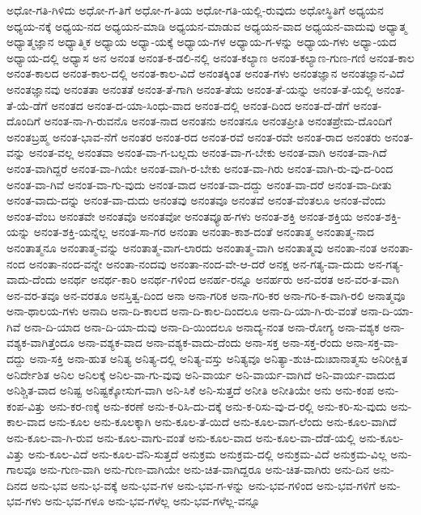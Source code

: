 {ಅಧೋ-ಗತಿ-ಗಿಳಿದು
ಅಧೋ-ಗ-ತಿಗೆ
ಅಧೋ-ಗ-ತಿಯ
ಅಧೋ-ಗತಿ-ಯಲ್ಲಿ-ರುವುದು
ಅಧೋಸ್ಥಿತಿಗೆ
ಅಧ್ಯಯನ
ಅಧ್ಯಯ-ನಕ್ಕೆ
ಅಧ್ಯಯ-ನದ
ಅಧ್ಯಯನ-ಮಾಡಿ
ಅಧ್ಯಯನ-ಮಾಡುವ
ಅಧ್ಯಯನ-ವಾದ
ಅಧ್ಯಯನ-ವಾದುವು
ಅಧ್ಯಾತ್ಮ
ಅಧ್ಯಾತ್ಮಜ್ಞಾನ
ಅಧ್ಯಾತ್ಮಿಕ
ಅಧ್ಯಾಯ
ಅಧ್ಯಾ-ಯಕ್ಕೆ
ಅಧ್ಯಾಯ-ಗಳ
ಅಧ್ಯಾಯ-ಗ-ಳನ್ನು
ಅಧ್ಯಾಯ-ಗಳು
ಅಧ್ಯಾ-ಯದ
ಅಧ್ಯಾಯ-ದಲ್ಲಿ
ಅಧ್ಯಾಸ
ಅನ
ಅನಂತ
ಅನಂತ-ಕ-ಡಲಿ-ನಲ್ಲಿ
ಅನಂತ-ಕಲ್ಯಾಣ
ಅನಂತ-ಕಲ್ಯಾಣ-ಗುಣ-ಗಣಿ
ಅನಂತ-ಕಾಲ
ಅನಂತ-ಕಾಲದ
ಅನಂತ-ಕಾಲ-ದಲ್ಲಿ
ಅನಂತ-ಕಾಲ-ವಿದೆ
ಅನಂತಕ್ಕಿಂತ
ಅನಂತ-ಗಳು
ಅನಂತಜ್ಞಾನ
ಅನಂತಜ್ಞಾನ-ವಿದೆ
ಅನಂತಜ್ಞಾನವು
ಅನಂತತಾ
ಅನಂತತೆ
ಅನಂತ-ತೆ-ಗಾಗಿ
ಅನಂತ-ತೆಯ
ಅನಂತ-ತೆ-ಯನ್ನು
ಅನಂತ-ತೆ-ಯಲ್ಲಿ
ಅನಂತ-ತೆ-ಯೆ-ಡೆಗೆ
ಅನಂತದ
ಅನಂತ-ದ-ಯಾ-ಸಿಂಧು-ವಾದ
ಅನಂತ-ದಲ್ಲಿ
ಅನಂತ-ದಿಂದ
ಅನಂತ-ದೆ-ಡೆಗೆ
ಅನಂತ-ದೊಂದಿಗೆ
ಅನಂತ-ನಾ-ಗಿ-ರುವನೊ
ಅನಂತ-ನಾದ
ಅನಂತನು
ಅನಂತನೂ
ಅನಂತಪ್ರೀತಿ
ಅನಂತಪ್ರೇಮ-ದೊಂದಿಗೆ
ಅನಂತಬ್ರಹ್ಮ
ಅನಂತ-ಭಾವ-ನೆಗೆ
ಅನಂತರ
ಅನಂತ-ರದ
ಅನಂತ-ರವೆ
ಅನಂತ-ರವೇ
ಅನಂತ-ರಾದ
ಅನಂತರು
ಅನಂತ-ವನ್ನು
ಅನಂತ-ವಲ್ಲ
ಅನಂತವಾ
ಅನಂತ-ವಾ-ಗ-ಬಲ್ಲದು
ಅನಂತ-ವಾ-ಗ-ಬೇಕು
ಅನಂತ-ವಾಗಿ
ಅನಂತ-ವಾ-ಗಿದೆ
ಅನಂತ-ವಾಗಿದ್ದರೆ
ಅನಂತ-ವಾ-ಗಿಯೇ
ಅನಂತ-ವಾಗಿ-ರ-ಬೇಕು
ಅನಂತ-ವಾ-ಗಿರು
ಅನಂತ-ವಾಗಿ-ರು-ವು-ದ-ರಿಂದ
ಅನಂತ-ವಾ-ಗಿವೆ
ಅನಂತ-ವಾ-ಗು-ವುದು
ಅನಂತ-ವಾದ
ಅನಂತ-ವಾ-ದದ್ದು
ಅನಂತ-ವಾ-ದರೆ
ಅನಂತ-ವಾ-ದೀತು
ಅನಂತ-ವಾದು-ದನ್ನು
ಅನಂತ-ವಾ-ದುದು
ಅನಂತವು
ಅನಂತವೂ
ಅನಂತವೆ
ಅನಂತ-ವೆಂತಲೂ
ಅನಂತ-ವೆಂದು
ಅನಂತ-ವೆಂಬ
ಅನಂತವೇ
ಅನಂತವೊ
ಅನಂತವೋ
ಅನಂತವ್ಯೂಹ-ಗಳು
ಅನಂತ-ಶಕ್ತಿ
ಅನಂತ-ಶಕ್ತಿಯ
ಅನಂತ-ಶಕ್ತಿ-ಯನ್ನು
ಅನಂತ-ಶಕ್ತಿ-ಯನ್ನೆಲ್ಲ
ಅನಂತ-ಸಾ-ಗರ
ಅನಂತಾ
ಅನಂತಾ-ಕಾಶ-ದಂತೆ
ಅನಂತಾತ್ಮ
ಅನಂತಾತ್ಮ-ನಾದ
ಅನಂತಾತ್ಮನೂ
ಅನಂತಾತ್ಮ-ವನ್ನು
ಅನಂತಾತ್ಮ-ವಾಗ-ಲಾರದು
ಅನಂತಾತ್ಮ-ವಾಗಿ
ಅನಂತಾತ್ಮವು
ಅನಂತಾ-ನಂತ
ಅನಂತಾ-ನಂದ
ಅನಂತಾ-ನಂದ-ವನ್ನೇ
ಅನಂತಾ-ನಂದವು
ಅನಂತಾ-ನಂದ-ವೇ-ಆ-ದರೆ
ಅನಕ್ಷ
ಅನ-ಗತ್ಯ-ವಾ-ದುದು
ಅನ-ಗತ್ಯ-ವಾದು-ದೆಂದು
ಅನರ್ಥ
ಅನರ್ಥ-ಕಾರಿ
ಅನರ್ಥ-ಗಳಿಂದ
ಅನರ್ಹ-ರನ್ನೂ
ಅನರ್ಹರು
ಅನ-ವರತ
ಅನ-ವರ-ತ-ವಾಗಿ
ಅನ-ವರ-ತವೂ
ಅನ-ವರತೂ
ಅನಸ್ತಿತ್ವ-ದಿಂದ
ಅನಾ
ಅನಾ-ಗರಿಕ
ಅನಾ-ಗರಿ-ಕರ
ಅನಾ-ಗರಿ-ಕ-ವಾಗಿ-ರಲಿ
ಅನಾತ್ಮವೂ
ಅನಾ-ಥಾಲಯ-ಗಳು
ಅನಾದಿ
ಅನಾ-ದಿ-ಕಾಲದ
ಅನಾ-ದಿ-ಕಾಲ-ದಿಂದಲೂ
ಅನಾ-ದಿ-ಯಾ-ಗಿ-ರು-ವಂತೆ
ಅನಾ-ದಿ-ಯಾ-ಗಿವೆ
ಅನಾ-ದಿ-ಯಾದ
ಅನಾ-ದಿ-ಯಾ-ದುವು
ಅನಾ-ದಿ-ಯಿಂದಲೂ
ಅನಾದ್ಯ-ನಂತ
ಅನಾ-ರೋಗ್ಯ
ಅನಾ-ವಶ್ಯಕ
ಅನಾ-ವಶ್ಯಕ-ವಾಗಿತ್ತೆಂದೂ
ಅನಾ-ವಶ್ಯಕ-ವಾದ
ಅನಾ-ವಶ್ಯಕ-ವಾದು-ದೆಂದು
ಅನಾ-ಸಕ್ತ
ಅನಾ-ಸಕ್ತ-ರೆಂದು
ಅನಾ-ಸಕ್ತ-ವಾ-ದದ್ದು
ಅನಾ-ಸಕ್ತಿ
ಅನಾ-ಹುತ
ಅನಿತ್ಯ
ಅನಿತ್ಯ-ದಲ್ಲಿ
ಅನಿತ್ಯ-ವಸ್ತು
ಅನಿತ್ಯವೂ
ಅನಿತ್ಯಾ-ಶುಚಿ-ದುಃಖಾನಾತ್ಮಸು
ಅನಿರೀಕ್ಷಿತ
ಅನಿರ್ದೇಶಿತ
ಅನಿಲ
ಅನಿಲಕ್ಕೆ
ಅನಿಲ-ವಾ-ಗು-ವುವು
ಅನಿ-ವಾರ್ಯ
ಅನಿ-ವಾರ್ಯ-ವಾಗಿದೆ
ಅನಿ-ವಾರ್ಯ-ವಾದುದ
ಅನಿಶ್ಚಿತ-ವಾದ
ಅನಿಷ್ಟ
ಅನಿಷ್ಟಕ್ಕೋಸುಗ-ವಾಗಿ
ಅನಿ-ಸಿಕೆ
ಅನಿ-ಸುತ್ತದೆ
ಅನೀತಿ
ಅನೀತಿಯೇ
ಅನು
ಅನು-ಕಂಪ
ಅನು-ಕಂಪ-ವಿತ್ತು
ಅನು-ಕರ-ಣಕ್ಕೆ
ಅನು-ಕರಣೆ
ಅನು-ಕ-ರಿಸಿ-ದು-ದಕ್ಕೆ
ಅನು-ಕ-ರಿಸು-ವು-ದ-ರಲ್ಲಿ
ಅನು-ಕರಿ-ಸು-ವುದು
ಅನು-ಕಾಲ-ವಾದ
ಅನು-ಕೂಲ
ಅನು-ಕೂಲಕ್ಕಾಗಿ
ಅನು-ಕೂಲ-ತೆ-ಯಿದೆ
ಅನು-ಕೂಲ-ವಾಗ-ಲೆಂದು
ಅನು-ಕೂಲ-ವಾಗಿದೆ
ಅನು-ಕೂಲ-ವಾ-ಗಿ-ರುವ
ಅನು-ಕೂಲ-ವಾಗು-ವಂತೆ
ಅನು-ಕೂಲ-ವಾದ
ಅನು-ಕೂಲ-ವಾ-ದೆಡೆ-ಯಲ್ಲಿ
ಅನು-ಕೂಲ-ವಿತ್ತು
ಅನು-ಕೂಲ-ವಿದೆ
ಅನು-ಕೂಲ-ವೆನಿ-ಸುತ್ತದೆ
ಅನುಕ್ರಮ
ಅನುಕ್ರಮ-ದಲ್ಲಿ
ಅನುಕ್ರಮ-ವಿದೆ
ಅನುಕ್ರಮ-ವಿಲ್ಲ
ಅನು-ಗಾಲವೂ
ಅನು-ಗುಣ-ವಾಗಿ
ಅನು-ಗುಣ-ವಾಗಿಯೇ
ಅನು-ಚಿತ-ವಾಗಿದ್ದರೂ
ಅನು-ಚಿತ-ವಾಗಿರು
ಅನು-ದಿನ
ಅನು-ದಿನದ
ಅನು-ಭವ
ಅನು-ಭ-ವಕ್ಕೆ
ಅನು-ಭವ-ಗಳ
ಅನು-ಭವ-ಗ-ಳನ್ನು
ಅನು-ಭವ-ಗಳಿಂದ
ಅನು-ಭವ-ಗಳಿಗೆ
ಅನು-ಭವ-ಗಳು
ಅನು-ಭವ-ಗಳೂ
ಅನು-ಭವ-ಗಳೆಲ್ಲ
ಅನು-ಭವ-ಗಳೆಲ್ಲ-ವನ್ನೂ
}

